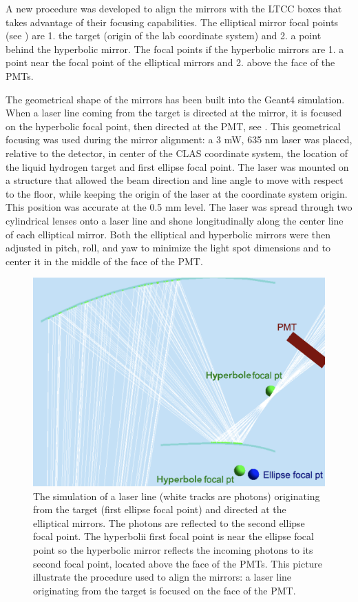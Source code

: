 A new procedure was developed to align the mirrors with the LTCC boxes that takes advantage of their focusing capabilities.
The elliptical mirror focal points (see ) are 1. the target (origin of the lab coordinate system)
and 2. a point behind the hyperbolic mirror. The focal points if the hyperbolic mirrors are 1. a point near the focal point of the elliptical mirrors and
2. above the face of the PMTs.

The geometrical shape of the mirrors has been built into the Geant4 simulation. When a laser line coming from the target is directed at the mirror,
it is focused on the hyperbolic focal point, then directed at the PMT, see .
This geometrical focusing was used during the mirror alignment: a 3 mW, 635 nm laser was placed, relative to the detector,
in center of the CLAS coordinate system, the location of the liquid hydrogen target and first ellipse focal point.
The laser was mounted on a structure that allowed the beam direction and line angle to move with respect to the floor, while keeping
the origin of the laser at the coordinate system origin.
This position was accurate at the 0.5 mm level. The laser was spread through two cylindrical lenses onto a laser line and shone
longitudinally along the center line of each elliptical mirror. Both the elliptical and hyperbolic mirrors were then adjusted in pitch, roll, and yaw to minimize the light spot
dimensions and to center it in the middle of the face of the PMT.


\begin{figure}[h]
\centering
	\includegraphics[width=0.95\columnwidth, keepaspectratio]{img/mirrorAlignmentSimulationZoomed.png}
	\caption{The simulation of a laser line (white tracks are photons) originating from the target (first ellipse focal point) and directed at the elliptical mirrors. The photons are reflected
		      to the second ellipse focal point. The hyperbolii first focal point is near the ellipse focal point so the hyperbolic mirror
			   reflects the incoming photons to its second focal point, located above the face of the PMTs.
	         This picture illustrate the procedure used to align the mirrors: a laser line originating from the target is focused on the face of the PMT.}
	\label{fig:alignmentSimulation}
\end{figure}


